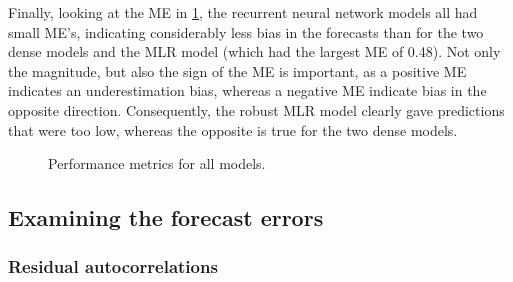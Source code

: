 Finally, looking at the ME in \cref{fig:metrics_barchart}, the recurrent neural network models all had small ME's, indicating considerably less bias in the forecasts than for the two dense models and the MLR model (which had the largest ME of 0.48). Not only the magnitude, but also the sign of the ME is important, as a positive ME indicates an underestimation bias, whereas a negative ME indicate bias in the opposite direction. Consequently, the robust MLR model clearly gave predictions that were too low, whereas the opposite is true for the two dense models. 


\begin{figure}[h] 
\begin{center}
\caption{Performance metrics for all models.}
\label{fig:metrics_barchart}
\end{center}
\end{figure}

\subsection{Examining the forecast errors}

\subsubsection{Residual autocorrelations}

